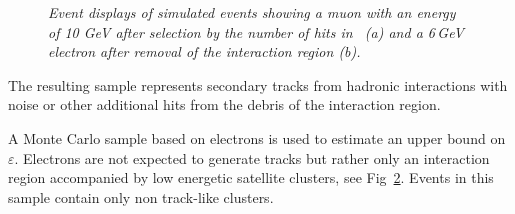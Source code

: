 \begin{figure}
\begin{subfigure}{0.5\textwidth}
		\caption{\label{fig:esys}}
	\end{subfigure}
	\caption{ \sl Event displays of simulated events showing a muon with an energy of 10 GeV after selection by the number of hits in \ecal\ \textit{(a)} and a 6\,GeV electron after removal of the interaction region \textit{(b)}.}
\end{figure}
The resulting sample represents secondary tracks from hadronic interactions with noise or other additional hits from the debris of the interaction region. 

A Monte Carlo sample based on electrons is used to estimate an upper bound on $\varepsilon$. Electrons are not expected to generate tracks but rather only an interaction region accompanied  by low energetic satellite clusters, see Fig~\ref{fig:esys}. Events in this sample contain only non track-like clusters. 
